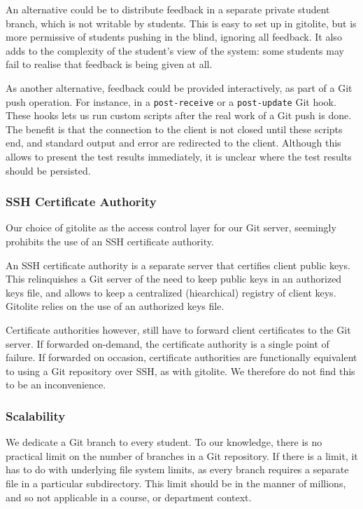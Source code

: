 An alternative could be to distribute feedback in a separate private student
branch, which is not writable by students. This is easy to set up in gitolite,
but is more permissive of students pushing in the blind, ignoring all feedback.
It also adds to the complexity of the student's view of the system: some
students may fail to realise that feedback is being given at all.

As another alternative, feedback could be provided interactively, as part of a
Git push operation. For instance, in a \texttt{post-receive} or a
\texttt{post-update} Git hook. These hooks lets us run custom scripts after the
real work of a Git push is done. The benefit is that the connection to the
client is not closed until these scripts end, and standard output and error are
redirected to the client\cite{man-5-githooks}. Although this allows to present
the test results immediately, it is unclear where the test results should be
persisted.

\subsubsection{SSH Certificate Authority}

\label{section:gitolite-ssh-certificate-authority}

Our choice of gitolite as the access control layer for our Git server,
seemingly prohibits the use of an SSH certificate authority.

An SSH certificate authority is a separate server that certifies client public
keys.  This relinquishes a Git server of the need to keep public keys in an
authorized keys file, and allows to keep a centralized (hiearchical) registry
of client keys. Gitolite relies on the use of an authorized keys file.

Certificate authorities however, still have to forward client certificates to
the Git server. If forwarded on-demand, the certificate authority is a single
point of failure. If forwarded on occasion, certificate authorities are
functionally equivalent to using a Git repository over SSH, as with gitolite.
We therefore do not find this to be an inconvenience.

\subsubsection{Scalability}

\label{section:git-server-scalability}

We dedicate a Git branch to every student. To our knowledge, there is no
practical limit on the number of branches in a Git repository. If there is a
limit, it has to do with underlying file system limits, as every branch
requires a separate file in a particular subdirectory. This limit should be in
the manner of millions, and so not applicable in a course, or department
context.


